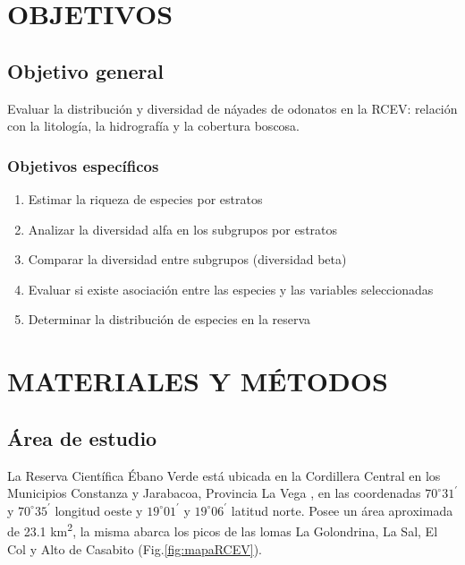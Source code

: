 \documentclass[12pt,letterpaper,spanish]{article}
\begin{document}
\newpage
\section*{OBJETIVOS}
\vspace*{1.0cm}
\subsection{Objetivo general}

Evaluar la distribución y diversidad de náyades de odonatos en la RCEV: relación con la litología, la hidrografía y la cobertura boscosa.

\subsubsection{Objetivos específicos}
\begin{enumerate}
\item Estimar la riqueza de especies por estratos
\item Analizar la diversidad alfa en los subgrupos por estratos 
\item Comparar la diversidad entre subgrupos (diversidad beta) 
\item Evaluar si existe asociación entre las especies y las variables seleccionadas
\item Determinar la distribución de especies en la reserva
\end{enumerate}

\newpage
\section*{MATERIALES Y MÉTODOS}
\subsection{Área de estudio}

La Reserva Científica Ébano Verde está ubicada en la Cordillera Central en los Municipios Constanza y Jarabacoa, Provincia La Vega \citep{ley2013202}, en las coordenadas $70^\circ 31^\prime$  y $70^\circ 35^\prime$ longitud oeste y $19^\circ 01^\prime$ y $19^\circ 06^\prime$ latitud norte. Posee un área aproximada de 23.1 km\textsuperscript{2}, la misma abarca los picos de las lomas La Golondrina, La Sal, El Col y Alto de Casabito (Fig.\ref{fig:mapaRCEV}).
\end{document}
